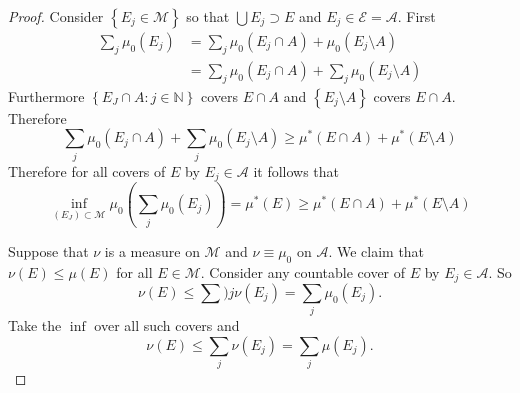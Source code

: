 \documentclass[letter]{article}
\newcommand{\set}[1]{ \left\{ #1 \right\} }
\def\scriptm{{\mathcal M}}
\def\scripte{{\mathcal E}}
\def\scripta{{\mathcal A}}
\begin{document}
\begin{proof}
		Consider $\set{E_j \in \scriptm}$ so that $\bigcup E_j \supset E$ and $E_j \in \scripte = \scripta$. First
		\begin{equation*}
			\begin{aligned}
				\sum_j \mu_0(E_j) &= \sum_j \mu_0(E_j \cap A) + \mu_0(E_j \setminus A) \\
				&= \sum_j \mu_0(E_j \cap A) + \sum_j \mu_0(E_j \setminus A)
 			\end{aligned}
		\end{equation*}
		Furthermore $\set{E_J \cap A: j \in \mathbb{N}}$ covers $E \cap A$ and $\set{E_j \setminus A}$ covers $E \cap A$. Therefore 
		\begin{equation*}
			\sum_j \mu_0(E_j \cap A) + \sum_j \mu_0(E_j \setminus A) \geq \mu^*(E \cap A) + \mu^*(E \setminus A) 
		\end{equation*}
		Therefore for all covers of $E$ by $E_j \in \scripta$ it follows that
		\begin{equation*}
			\inf_{(E_J) \subset \scriptm}\mu_0\left(\sum_j \mu_0 (E_j)\right) = \mu^*(E) \geq 	\mu^*(E \cap A) + \mu^*(E \setminus A) 
		\end{equation*}


		Suppose that $\nu$ is a measure on $\scriptm$ and $\nu \equiv \mu_0$ on $\scripta$. We claim that $\nu(E) \leq \mu(E)$ for all $E \in \scriptm$. Consider any countable cover of $E$ by $E_j \in \scripta$. So $$\nu(E) \leq \sum)j \nu(E_j) = \sum_j \mu_0(E_j).$$ Take the $\inf$ over all such covers and 
		\begin{equation*}
			\nu(E) \leq \sum_j \nu(E_j) = \sum_j \mu(E_j).
		\end{equation*}
\end{proof}


\end{document}
